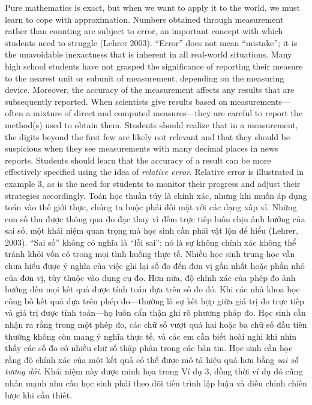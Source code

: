 \documentclass[
  10pt,
  a4paper,
  landscape,
  twoside,
  openany
]{scrbook}
\newcommand{\EN}[1]{#1}
\newcommand{\VI}[1]{#1}
\newcommand{\NOTE}[1]{#1}
\newcounter{example}
\begin{document}
\TriPara
{
\EN{Pure mathematics is exact, but when we want to apply it to the world, we must learn to cope with approximation. Numbers obtained through measurement rather than counting are subject to error, an important concept with which students need to struggle (Lehrer 2003). ``Error'' does not mean ``mistake''; it is the unavoidable inexactness that is inherent in all real-world situations. Many high school students have not grasped the significance of reporting their measure to the nearest unit or subunit of measurement, depending on the measuring device. Moreover, the accuracy of the measurement affects any results that are subsequently reported. When scientists give results based on measurements---often a mixture of direct and computed measures---they are careful to report the method(s) used to obtain them. Students should realize that in a measurement, the digits beyond the first few are likely not relevant and that they should be suspicious when they see measurements with many decimal places in news reports. Students should learn that the accuracy of a result can be more effectively specified using the idea of \emph{relative error}. Relative error is illustrated in example 3, as is the need for students to monitor their progress and adjust their strategies accordingly.}
}
{
\VI{Toán học thuần túy là chính xác, nhưng khi muốn áp dụng toán vào thế giới thực, chúng ta buộc phải đối mặt với các dạng xấp xỉ. Những con số thu được thông qua đo đạc thay vì đếm trực tiếp luôn chịu ảnh hưởng của sai số, một khái niệm quan trọng mà học sinh cần phải vật lộn để hiểu (Lehrer, 2003). ``Sai số'' không có nghĩa là ``lỗi sai''; nó là sự không chính xác không thể tránh khỏi vốn có trong mọi tình huống thực tế. Nhiều học sinh trung học vẫn chưa hiểu được ý nghĩa của việc ghi lại số đo đến đơn vị gần nhất hoặc phần nhỏ của đơn vị, tùy thuộc vào dụng cụ đo. Hơn nữa, độ chính xác của phép đo ảnh hưởng đến mọi kết quả được tính toán dựa trên số đo đó. Khi các nhà khoa học công bố kết quả dựa trên phép đo---thường là sự kết hợp giữa giá trị đo trực tiếp và giá trị được tính toán---họ luôn cẩn thận ghi rõ phương pháp đo. Học sinh cần nhận ra rằng trong một phép đo, các chữ số vượt quá hai hoặc ba chữ số đầu tiên thường không còn mang ý nghĩa thực tế, và các em cần biết hoài nghi khi nhìn thấy các số đo có nhiều chữ số thập phân trong các bản tin. Học sinh cần học rằng độ chính xác của một kết quả có thể được mô tả hiệu quả hơn bằng \emph{sai số tương đối}. Khái niệm này được minh họa trong Ví dụ 3, đồng thời ví dụ đó cũng nhấn mạnh nhu cầu học sinh phải theo dõi tiến trình lập luận và điều chỉnh chiến lược khi cần thiết.}
}
{
\NOTE{}
}
\end{document}
